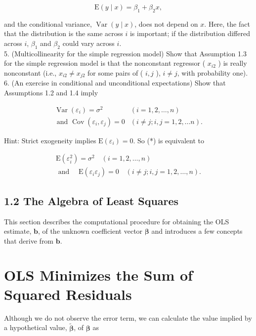 \documentclass[10pt]{article}
\begin{document}
$$
\mathrm{E}(y \mid x)=\beta_{1}+\beta_{2} x,
$$

and the conditional variance, $\operatorname{Var}(y \mid x)$, does not depend on $x$. Here, the fact that the distribution is the same across $i$ is important; if the distribution differed across $i$, $\beta_{1}$ and $\beta_{2}$ could vary across $i$.\\
5. (Multicollinearity for the simple regression model) Show that Assumption 1.3 for the simple regression model is that the nonconstant regressor ( $x_{i 2}$ ) is really nonconstant (i.e., $x_{i 2} \neq x_{j 2}$ for some pairs of ( $i, j$ ), $i \neq j$, with probability one).\\
6. (An exercise in conditional and unconditional expectations) Show that Assumptions 1.2 and 1.4 imply


\begin{align*}
\operatorname{Var}\left(\varepsilon_{i}\right)=\sigma^{2} & (i=1,2, \ldots, n) \\
\text { and } \operatorname{Cov}\left(\varepsilon_{i}, \varepsilon_{j}\right)=0 & (i \neq j ; i, j=1,2, \ldots n) . \tag{*}
\end{align*}


Hint: Strict exogeneity implies $\mathrm{E}\left(\varepsilon_{i}\right)=0$. So (*) is equivalent to

$$
\begin{gathered}
\mathrm{E}\left(\varepsilon_{i}^{2}\right)=\sigma^{2} \quad(i=1,2, \ldots, n) \\
\text { and } \quad \mathrm{E}\left(\varepsilon_{i} \varepsilon_{j}\right)=0 \quad(i \neq j ; i, j=1,2, \ldots, n) .
\end{gathered}
$$

\subsection*{1.2 The Algebra of Least Squares}
This section describes the computational procedure for obtaining the OLS estimate, $\mathbf{b}$, of the unknown coefficient vector $\boldsymbol{\beta}$ and introduces a few concepts that derive from $\mathbf{b}$.

\section*{OLS Minimizes the Sum of Squared Residuals}
Although we do not observe the error term, we can calculate the value implied by a hypothetical value, $\widetilde{\boldsymbol{\beta}}$, of $\boldsymbol{\beta}$ as
\end{document}
